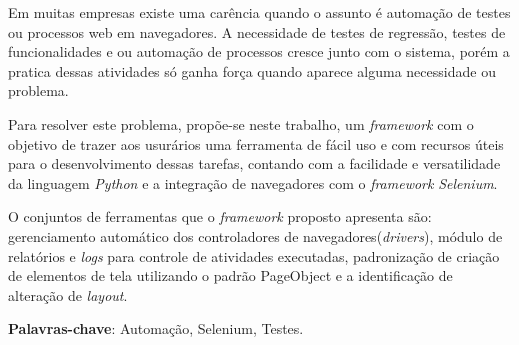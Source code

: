%
%

\begin{RESUMO}
\thispagestyle{empty}
	\begin{SingleSpace}


		Em muitas empresas existe uma carência quando o assunto é automação de testes ou processos web em navegadores. A necessidade de testes de regressão, testes de funcionalidades e ou
        automação de processos cresce junto com o sistema, porém a pratica dessas atividades só ganha força quando aparece alguma necessidade ou problema.

        Para resolver este problema, propõe-se neste trabalho, um \textit{framework} com o objetivo de trazer aos usurários uma ferramenta de fácil uso e com recursos úteis para o desenvolvimento dessas tarefas, contando com a facilidade e versatilidade da
        linguagem \textit{Python} e a integração de navegadores com o \textit{framework} \textit{Selenium}.

        O conjuntos de ferramentas que o \textit{framework} proposto apresenta são: gerenciamento automático dos controladores de navegadores(\textit{drivers}), módulo de relatórios e \textit{logs} para controle de atividades executadas,
        padronização de criação de elementos de tela utilizando o padrão PageObject e a identificação de alteração de \textit{layout}.

		\vspace*{0.5cm}\hspace{-1.3 cm}\textbf{Palavras-chave}: Automação, Selenium, Testes.

	\end{SingleSpace}
\end{RESUMO}



